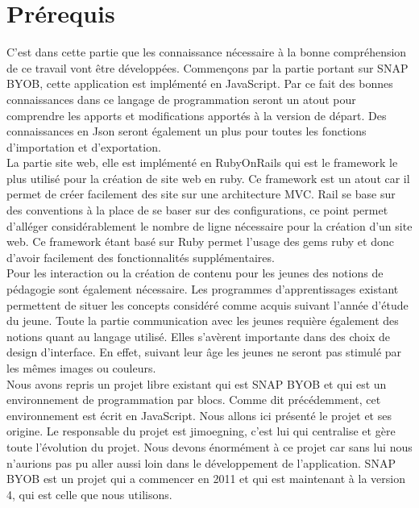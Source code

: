 \section{Prérequis}
C'est dans cette partie que les connaissance nécessaire à la bonne compréhension de ce travail vont être développées. Commençons par la partie portant sur SNAP BYOB, cette application est implémenté en JavaScript. Par ce fait des bonnes connaissances dans ce langage de programmation seront un atout pour comprendre les apports et modifications apportés à la version de départ. Des connaissances en Json seront également un plus pour toutes les fonctions d'importation et d'exportation.\\

La partie site web, elle est implémenté en RubyOnRails qui est le framework le plus utilisé pour la création de site web en ruby. Ce framework est un atout car il permet de créer facilement des site sur une architecture MVC. Rail se base sur des conventions à la place de se baser sur des configurations, ce point permet d'alléger considérablement le nombre de ligne nécessaire pour la création d'un site web. Ce framework étant basé sur Ruby permet l'usage des gems ruby et donc d'avoir facilement des fonctionnalités supplémentaires.\\

Pour les interaction ou la création de contenu pour les jeunes des notions de pédagogie sont également nécessaire. Les programmes d'apprentissages existant permettent de situer les concepts considéré comme acquis suivant l'année d'étude du jeune. Toute la partie communication avec les jeunes requière également des notions quant au langage utilisé. Elles s'avèrent importante dans des choix de design d'interface. En effet, suivant leur âge les jeunes ne seront pas stimulé par les mêmes images ou couleurs.\\

Nous avons repris un projet libre existant qui est SNAP BYOB et qui est un environnement de programmation par blocs. Comme dit précédemment, cet environnement est écrit en JavaScript. Nous allons ici présenté le projet et ses origine. Le responsable du projet est jimoegning, c'est lui qui centralise et gère toute l'évolution du projet. Nous devons énormément à ce projet car sans lui nous n'aurions pas pu aller aussi loin dans le développement de l'application. SNAP BYOB est un projet qui a commencer en 2011 et qui est maintenant à la version 4, qui est celle que nous utilisons.
